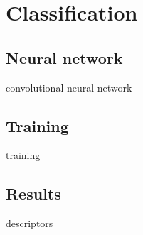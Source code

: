
\chapter{Classification}
\label{cha:classification}


\section{Neural network}
\label{sec:neural}

convolutional neural network


\section{Training}
\label{sec:training}

training


\section{Results}
\label{sec:results}

descriptors